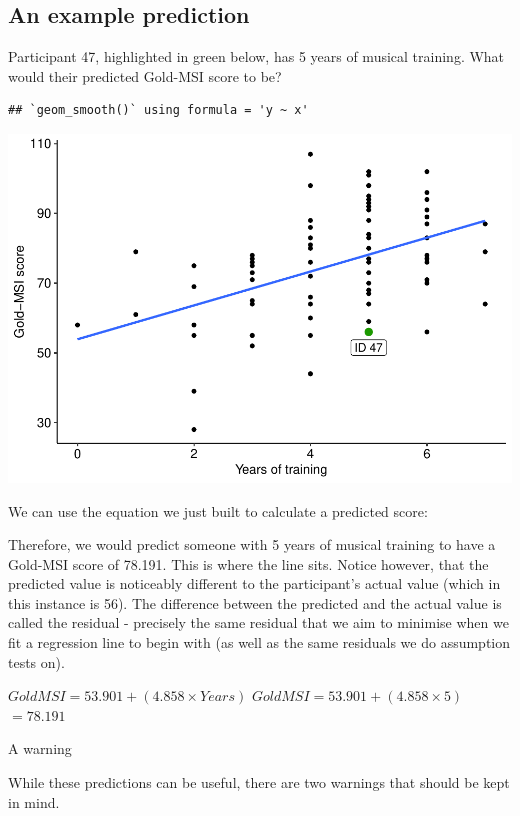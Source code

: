 \documentclass[
]{book}
\begin{document}
\hypertarget{an-example-prediction}{%
\subsection{An example prediction}\label{an-example-prediction}}

Participant 47, highlighted in green below, has 5 years of musical training. What would their predicted Gold-MSI score to be?

\begin{verbatim}
## `geom_smooth()` using formula = 'y ~ x'
\end{verbatim}

\includegraphics{_main_files/figure-latex/unnamed-chunk-202-1.pdf}

We can use the equation we just built to calculate a predicted score:

Therefore, we would predict someone with 5 years of musical training to have a Gold-MSI score of 78.191. This is where the line sits. Notice however, that the predicted value is noticeably different to the participant's actual value (which in this instance is 56). The difference between the predicted and the actual value is called the residual - precisely the same residual that we aim to minimise when we fit a regression line to begin with (as well as the same residuals we do assumption tests on).

\(GoldMSI = 53.901 + (4.858 \times Years)\)
\(GoldMSI = 53.901 + (4.858 \times 5)\)
\(=78.191\)

A warning

While these predictions can be useful, there are two warnings that should be kept in mind.
\end{document}
